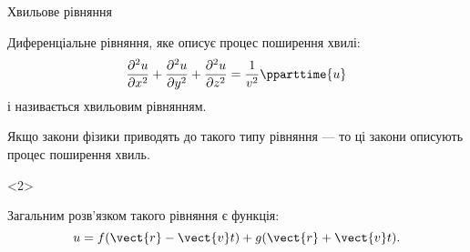 \documentclass{beamer}
\begin{document}
\begin{frame}{Хвильове рівняння}{}
	\begin{block}{}\justifying
		Диференціальне рівняння, яке описує процес поширення хвилі:
		\begin{equation*}
			\frac{\partial^2 u}{\partial x^2} + \frac{\partial^2 u}{\partial y^2} + \frac{\partial^2 u}{\partial z^2}= \frac1{v^2}\pparttime{u}
		\end{equation*}
		і називається \alert{хвильовим рівнянням}.
	\end{block}
	\begin{alertblock}{}\centering
		Якщо закони фізики приводять до такого типу рівняння --- то ці закони описують процес поширення хвиль.
	\end{alertblock}
	\begin{onlyenv}
		\begin{block}{}
			Загальним розв'язком такого рівняння є функція:
			\begin{equation*}
				u = f(\vect{r} - \vect{v}t) + g(\vect{r} + \vect{v}t).
			\end{equation*}
		\end{block}
	\end{onlyenv}

\end{frame}
\end{document}
